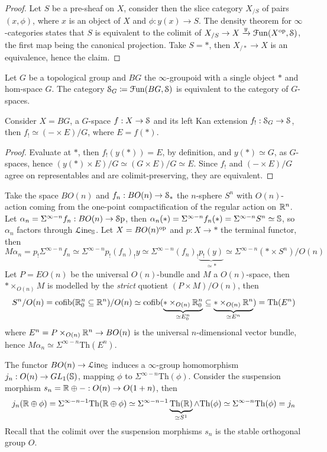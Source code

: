 \documentclass[10pt]{amsart}
\begin{document}
\begin{proof}
	Let $S$ be a pre-sheaf on $X$, consider then the slice category $X_{/S}$ of pairs $(x,\phi)$, where $x$ is an object of $X$ and $\phi:y(x)\to S$. The density theorem for $\infty$-categories states that $S$ is equivalent to the colimit of $X_{/S}\to X\xrightarrow{y}\mathcal{F}\mathrm{un}(X^{\mathrm{op}},\mathcal{S})$, the first map being the canonical projection. Take $S=*$, then $X_{/*}\to X$ is an equivalence, hence the claim. 
\end{proof}
Let $G$ be a topological group and $BG$ the $\infty$-groupoid with a single object $*$ and hom-space $G$. The category $\mathcal{S}_G\coloneqq\mathcal{F}\mathrm{un}(BG,\mathcal{S})$ is equivalent to the category of $G$-spaces.
\begin{lemma}
	Consider $X=BG$, a $G$-space $f:X\to\mathcal{S}$ and its left Kan extension $f_!:\mathcal{S}_G\to\mathcal{S}$, then $f_!\simeq(-\times E)/G$, where $E=f(*)$. 
\end{lemma}
\begin{proof}
	Evaluate at $*$, then $f_!(y(*))=E$, by definition, and $y(*)\simeq G$, as $G$-spaces, hence $(y(*)\times E)/G\simeq(G\times E)/G\simeq E$. Since $f_!$ and $(-\times E)/G$ agree on representables and are colimit-preserving, they are equivalent. 
\end{proof}
\begin{example}\label{ex:bundle}Take the space $BO(n)$ and $f_n:BO(n)\to\mathcal{S}_*$ the $n$-sphere $S^n$ with $O(n)$-action coming from the one-point compactification of the regular action on $\mathbb{R}^n$. Let $\alpha_n=\Sigma^{\infty-n}f_n:BO(n)\to\mathcal{S}\mathrm{p}$, then $\alpha_n(*)=\Sigma^{\infty-n}f_n(*)=\Sigma^{\infty-n}S^n\simeq\mathbb{S}$, so $\alpha_n$ factors through $\mathcal{L}\mathrm{ine}_{\mathbb{S}}$. Let $X=BO(n)^{\mathrm{op}}$ and $p:X\to*$ the terminal functor, then \[M\alpha_n=p_!\Sigma^{\infty-n}f_n\simeq\Sigma^{\infty-n}p_!(f_n)_!y\simeq\Sigma^{\infty-n}(f_n)_!\underbrace{p_!(y)}_{\simeq*}\simeq\Sigma^{\infty-n}(*\times S^n)/O(n)\]
Let $P=EO(n)$ be the universal $O(n)$-bundle and $M$ a $O(n)$-space, then $*\times_{O(n)} M$ is modelled by the \emph{strict} quotient $(P\times M)/O(n)$, then \[S^n/O(n)=\mathrm{cofib}(\mathbb{R}^n_0\subseteq\mathbb{R}^n)/O(n)\simeq\mathrm{cofib}(\underbrace{*\times_{O(n)}\mathbb{R}^n_0}_{\simeq E^n_0}\subseteq\underbrace{ *\times_{O(n)}\mathbb{R}^n}_{\simeq E^n})=\mathrm{Th}(E^n) \]
where $E^n=P\times_{O(n)}\mathbb{R}^n\to BO(n)$ is the universal $n$-dimensional vector bundle, hence $M\alpha_n\simeq\Sigma^{\infty-n}\mathrm{Th}(E^n)$. 
\end{example}
The functor $BO(n)\to\mathcal{L}\mathrm{ine}_{\mathbb{S}}$ induces a $\infty$-group homomorphism $j_n:O(n)\to GL_1(\mathbb{S})$, mapping $\phi$ to $\Sigma^{\infty-n}\mathrm{Th}(\phi)$. Consider the suspension morphism $s_n=\mathbb{R}\oplus-:O(n)\to O(1+n)$, then $$j_n(\mathbb{R}\oplus\phi)=\Sigma^{\infty-n-1}\mathrm{Th}(\mathbb{R}\oplus\phi)\simeq\Sigma^{\infty-n-1}\underbrace{\mathrm{Th}(\mathbb{R})}_{\simeq S^1}\wedge\mathrm{Th}(\phi)\simeq\Sigma^{\infty-n}\mathrm{Th}(\phi)=j_n$$Recall that the colimit over the suspension morphisms $s_n$ is the stable orthogonal group $O$.
\end{document}
